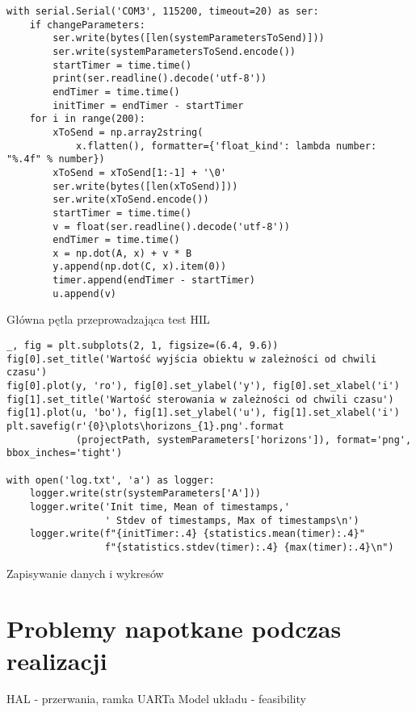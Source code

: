 \begin{listing}[htb]
\begin{verbatim}
with serial.Serial('COM3', 115200, timeout=20) as ser:
    if changeParameters:
        ser.write(bytes([len(systemParametersToSend)]))
        ser.write(systemParametersToSend.encode())
        startTimer = time.time()
        print(ser.readline().decode('utf-8'))
        endTimer = time.time()
        initTimer = endTimer - startTimer
    for i in range(200):
        xToSend = np.array2string(
            x.flatten(), formatter={'float_kind': lambda number: "%.4f" % number})
        xToSend = xToSend[1:-1] + '\0'
        ser.write(bytes([len(xToSend)]))
        ser.write(xToSend.encode())
        startTimer = time.time()
        v = float(ser.readline().decode('utf-8'))
        endTimer = time.time()
        x = np.dot(A, x) + v * B
        y.append(np.dot(C, x).item(0))
        timer.append(endTimer - startTimer)
        u.append(v)
\end{verbatim}
\caption{Główna pętla przeprowadzająca test HIL}
\label{lst:serial_py}
\end{listing}

\begin{listing}[htb]
\begin{verbatim}
_, fig = plt.subplots(2, 1, figsize=(6.4, 9.6))
fig[0].set_title('Wartość wyjścia obiektu w zależności od chwili czasu')
fig[0].plot(y, 'ro'), fig[0].set_ylabel('y'), fig[0].set_xlabel('i')
fig[1].set_title('Wartość sterowania w zależności od chwili czasu')
fig[1].plot(u, 'bo'), fig[1].set_ylabel('u'), fig[1].set_xlabel('i')
plt.savefig(r'{0}\plots\horizons_{1}.png'.format
            (projectPath, systemParameters['horizons']), format='png', bbox_inches='tight')

with open('log.txt', 'a') as logger:
    logger.write(str(systemParameters['A']))
    logger.write('Init time, Mean of timestamps,'
                 ' Stdev of timestamps, Max of timestamps\n')
    logger.write(f"{initTimer:.4} {statistics.mean(timer):.4}"
                 f"{statistics.stdev(timer):.4} {max(timer):.4}\n")
\end{verbatim}
\caption{Zapisywanie danych i wykresów}
\label{lst:write_py}
\end{listing}

\section{Problemy napotkane podczas realizacji} \label{sec:problems}
HAL - przerwania, ramka UARTa
Model układu - feasibility
